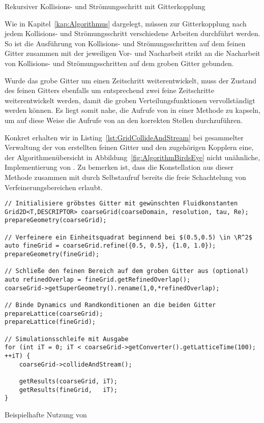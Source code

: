 \begin{listing}[H]
\inputminted{cpp}{code/grid2d_collide_and_stream.cpp}
\caption{Rekursiver Kollisions- und Strömungsschritt mit Gitterkopplung}
\label{lst:GridCollideAndStream}
\end{listing}

Wie in Kapitel~\ref{kap:Algorithmus} dargelegt, müssen zur Gitterkopplung nach jedem Kollisions- und Strömungsschritt verschiedene Arbeiten durchführt werden. So ist die Ausführung von Kollisions- und Strömungsschritten auf dem feinen Gitter zusammen mit der jeweiligen Vor- und Nacharbeit strikt an die Nacharbeit von Kollisions- und Strömungsschritten auf dem groben Gitter gebunden.

Wurde das grobe Gitter um einen Zeitschritt weiterentwickelt, muss der Zustand des feinen Gitters ebenfalls um entsprechend zwei feine Zeitschritte weiterentwickelt werden, damit die groben Verteilungsfunktionen vervollständigt werden können. Es liegt somit nahe, die Aufrufe von  in einer Methode  zu kapseln, um auf diese Weise die Aufrufe von  an den korrekten Stellen durchzuführen.

Konkret erhalten wir in Listing~\ref{lst:GridCollideAndStream} bei gesammelter Verwaltung der von  erstellten feinen Gitter und den zugehörigen Kopplern eine, der Algorithmenübersicht in Abbildung~\ref{fig:AlgorithmBirdsEye} nicht unähnliche, Implementierung von .
Zu bemerken ist, dass die Konstellation aus dieser Methode zusammen mit  durch Selbstaufruf bereits die freie Schachtelung von Verfeinerungsbereichen erlaubt.

\begin{listing}[H]
\begin{verbatim}
// Initialisiere gröbstes Gitter mit gewünschten Fluidkonstanten
Grid2D<T,DESCRIPTOR> coarseGrid(coarseDomain, resolution, tau, Re);
prepareGeometry(coarseGrid);

// Verfeinere ein Einheitsquadrat beginnend bei $(0.5,0.5) \in \R^2$
auto fineGrid = coarseGrid.refine({0.5, 0.5}, {1.0, 1.0});
prepareGeometry(fineGrid);

// Schließe den feinen Bereich auf dem groben Gitter aus (optional)
auto refinedOverlap = fineGrid.getRefinedOverlap();
coarseGrid->getSuperGeometry().rename(1,0,*refinedOverlap);

// Binde Dynamics und Randkonditionen an die beiden Gitter
prepareLattice(coarseGrid);
prepareLattice(fineGrid);

// Simulationsschleife mit Ausgabe
for (int iT = 0; iT < coarseGrid->getConverter().getLatticeTime(100); ++iT) {
	coarseGrid->collideAndStream();

	getResults(coarseGrid, iT);
	getResults(fineGrid,   iT);
}
\end{verbatim}
\caption{Beispielhafte Nutzung von }
\label{lst:RefinementUsageExample}
\end{listing}

